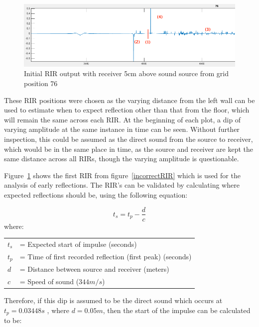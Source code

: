 \documentclass[../../main.tex]{subfiles}
\begin{document}
			\begin{figure}
				\centerline{\includegraphics[width=\textwidth]{Sections/Implementation/Odeon/images/incorrectRIR/RIR_76_incorrect_edit_crop.png}}
				\caption{Initial \ac{RIR} output with receiver 5cm above sound source from grid position 76}
				\label{incorrectRIR_76}
			\end{figure}

			These \ac{RIR} positions were chosen as the varying distance from the left wall can be used to estimate when to expect reflection other than that from the floor, which will remain the same across each \ac{RIR}. At the beginning of each plot, a dip of varying amplitude at the same instance in time can be seen. Without further inspection, this could be assumed as the direct sound from the source to receiver, which would be in the same place in time, as the source and receiver are kept the same distance across all RIRs, though the varying amplitude is questionable.

			Figure~\ref{incorrectRIR_76} shows the first \ac{RIR} from figure~\ref{incorrectRIR} which is used for the analysis of early reflections. The \ac{RIR}'s can be validated by calculating where expected reflections should be, using the following equation:
			
			\begin{equation}\label{distance}
				t_s = t_p - \frac{d}{c}
			\end{equation}
			where:

			\begin{tabular}{l l}
			$t_s$ & = Expected start of impulse (seconds)\\
			$t_p$ & = Time of first recorded reflection (first peak) (seconds)\\
			$d$ & = Distance between source and receiver (meters)\\
			$c$ & = Speed of sound ($344m/s$) \\
			\end{tabular}


			Therefore, if this dip is assumed to be the direct sound which occurs at $t_p = 0.03448s$ , where $d = 0.05m$, then the start of the impulse can be calculated to be:
\end{document}
